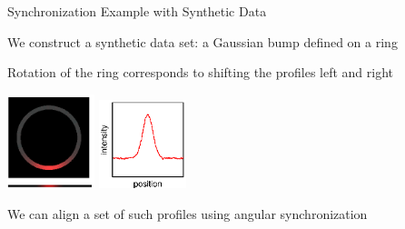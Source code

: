 \documentclass[10pt]{beamer}
\begin{document}
\begin{frame}{Synchronization Example with Synthetic Data}

\begin{center}
We construct a synthetic data set: a Gaussian bump defined on a ring

Rotation of the ring corresponds to shifting the profiles left and right

\includegraphics[width=1in]{fig3a}
%
\includegraphics[width=1in]{fig3b}


We can align a set of such profiles using angular synchronization

\end{center}

\end{frame}
\end{document}
